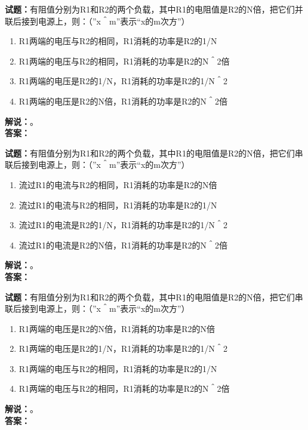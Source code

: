 \documentclass{ctexbook}
\begin{document}
\noindent\textbf{试题：}有阻值分别为R1和R2的两个负载，其中R1的电阻值是R2的N倍，把它们并联后接到电源上，则：（”x＾m”表示“x的m次方”）
\begin{enumerate}[leftmargin=3em]
  \item R1两端的电压与R2的相同，R1消耗的功率是R2的1/N
  \item R1两端的电压与R2的相同，R1消耗的功率是R2的N＾2倍
  \item R1两端的电压是R2的1/N，R1消耗的功率是R2的1/N＾2
  \item R1两端的电压是R2的N倍，R1消耗的功率是R2的N＾2倍
\end{enumerate}
\noindent\textbf{解说：}\textbf{}。\\\noindent\textbf{答案：}

\vspace{\baselineskip}

\noindent\textbf{试题：}有阻值分别为R1和R2的两个负载，其中R1的电阻值是R2的N倍，把它们串联后接到电源上，则：（”x＾m”表示“x的m次方”）
\begin{enumerate}[leftmargin=3em]
  \item 流过R1的电流与R2的相同，R1消耗的功率是R2的N倍
  \item 流过R1的电流与R2的相同，R1消耗的功率是R2的1/N
  \item 流过R1的电流是R2的1/N，R1消耗的功率是R2的1/N＾2
  \item 流过R1的电流是R2的N倍，R1消耗的功率是R2的N＾2倍
\end{enumerate}
\noindent\textbf{解说：}\textbf{}。\\\noindent\textbf{答案：}

\vspace{\baselineskip}

\noindent\textbf{试题：}有阻值分别为R1和R2的两个负载，其中R1的电阻值是R2的N倍，把它们串联后接到电源上，则：（”x＾m”表示“x的m次方”）
\begin{enumerate}[leftmargin=3em]
  \item R1两端的电压是R2的N倍，R1消耗的功率是R2的N倍
  \item R1两端的电压是R2的1/N，R1消耗的功率是R2的1/N＾2
  \item R1两端的电压与R2的相同，R1消耗的功率是R2的1/N
  \item R1两端的电压与R2的相同，R1消耗的功率是R2的N＾2倍
\end{enumerate}
\noindent\textbf{解说：}\textbf{}。\\\noindent\textbf{答案：}

\vspace{\baselineskip}
\end{document}
